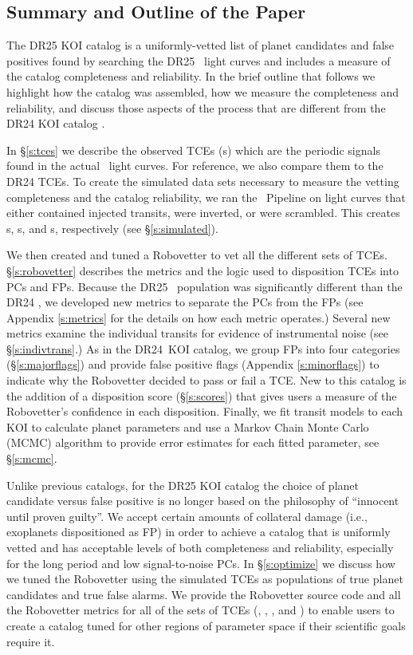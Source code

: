 \subsection{Summary and Outline of the Paper}

The DR25 KOI catalog is a uniformly-vetted list of planet candidates and false positives found by searching the DR25 \Kepler\ light curves and includes a measure of the catalog completeness and reliability. In the brief outline that follows we highlight how the catalog was assembled, how we measure the completeness and reliability, and discuss those aspects of the process that are different from the DR24 KOI catalog \citep{Coughlin2016}.

In \S\ref{s:tces} we describe the observed TCEs (\opstce s) which are the periodic signals found in the actual \Kepler\ light curves. For reference, we also compare them to the DR24 TCEs. To create the simulated data sets necessary to measure the vetting completeness and the catalog reliability, we ran the \Kepler\ Pipeline on light curves that either contained injected transits, were inverted, or were scrambled. This creates \injtce s, \invtce s, and \scrtce s, respectively (see \S\ref{s:simulated}).  

We then created and tuned a Robovetter to vet all the different sets of TCEs. \S\ref{s:robovetter} describes the metrics and the logic used to disposition TCEs into PCs and FPs.  Because the DR25 \opstce\ population was significantly different than the DR24 , we developed new metrics to separate the PCs from the FPs (see Appendix \ref{s:metrics} for the details on how each metric operates.) Several new metrics examine the individual transits for evidence of instrumental noise (see \S\ref{s:indivtrans}.) As in the DR24~KOI catalog, we group FPs into four categories (\S\ref{s:majorflags}) and provide false positive flags (Appendix \ref{s:minorflags}) to indicate why the Robovetter decided to pass or fail a TCE.  New to this catalog is the addition of a disposition score (\S\ref{s:scores}) that gives users a measure of the Robovetter's confidence in each disposition. Finally, we fit transit models to each KOI to calculate planet parameters and use a Markov Chain Monte Carlo (MCMC) algorithm to provide error estimates for each fitted parameter, see \S\ref{s:mcmc}.


Unlike previous catalogs, for the DR25 KOI catalog the choice of planet candidate versus false positive is no longer based on the philosophy of ``innocent until proven guilty''. We accept certain amounts of collateral damage (i.e., exoplanets dispositioned as FP) in order to achieve a catalog that is uniformly vetted and has acceptable levels of both completeness and reliability, especially for the long period and low signal-to-noise PCs. In \S\ref{s:optimize} we discuss how we tuned the Robovetter using the simulated TCEs as populations of true planet candidates and true false alarms. We provide the Robovetter source code and all the Robovetter metrics for all of the sets of TCEs (\opstces, \injtces, \invtces, and \scrtces) to enable users to create a catalog tuned for other regions of parameter space if their scientific goals require it. 

